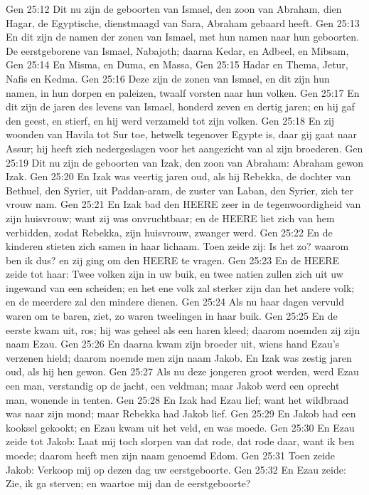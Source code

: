 Gen 25:12  Dit nu zijn de geboorten van Ismael, den zoon van Abraham, dien Hagar, de Egyptische, dienstmaagd van Sara, Abraham gebaard heeft.
Gen 25:13  En dit zijn de namen der zonen van Ismael, met hun namen naar hun geboorten. De eerstgeborene van Ismael, Nabajoth; daarna Kedar, en Adbeel, en Mibsam,
Gen 25:14  En Misma, en Duma, en Massa,
Gen 25:15  Hadar en Thema, Jetur, Nafis en Kedma.
Gen 25:16  Deze zijn de zonen van Ismael, en dit zijn hun namen, in hun dorpen en paleizen, twaalf vorsten naar hun volken.
Gen 25:17  En dit zijn de jaren des levens van Ismael, honderd zeven en dertig jaren; en hij gaf den geest, en stierf, en hij werd verzameld tot zijn volken.
Gen 25:18  En zij woonden van Havila tot Sur toe, hetwelk tegenover Egypte is, daar gij gaat naar Assur; hij heeft zich nedergeslagen voor het aangezicht van al zijn broederen.
Gen 25:19  Dit nu zijn de geboorten van Izak, den zoon van Abraham: Abraham gewon Izak.
Gen 25:20  En Izak was veertig jaren oud, als hij Rebekka, de dochter van Bethuel, den Syrier, uit Paddan-aram, de zuster van Laban, den Syrier, zich ter vrouw nam.
Gen 25:21  En Izak bad den HEERE zeer in de tegenwoordigheid van zijn huisvrouw; want zij was onvruchtbaar; en de HEERE liet zich van hem verbidden, zodat Rebekka, zijn huisvrouw, zwanger werd.
Gen 25:22  En de kinderen stieten zich samen in haar lichaam. Toen zeide zij: Is het zo? waarom ben ik dus? en zij ging om den HEERE te vragen.
Gen 25:23  En de HEERE zeide tot haar: Twee volken zijn in uw buik, en twee natien zullen zich uit uw ingewand van een scheiden; en het ene volk zal sterker zijn dan het andere volk; en de meerdere zal den mindere dienen.
Gen 25:24  Als nu haar dagen vervuld waren om te baren, ziet, zo waren tweelingen in haar buik.
Gen 25:25  En de eerste kwam uit, ros; hij was geheel als een haren kleed; daarom noemden zij zijn naam Ezau.
Gen 25:26  En daarna kwam zijn broeder uit, wiens hand Ezau's verzenen hield; daarom noemde men zijn naam Jakob. En Izak was zestig jaren oud, als hij hen gewon.
Gen 25:27  Als nu deze jongeren groot werden, werd Ezau een man, verstandig op de jacht, een veldman; maar Jakob werd een oprecht man, wonende in tenten.
Gen 25:28  En Izak had Ezau lief; want het wildbraad was naar zijn mond; maar Rebekka had Jakob lief.
Gen 25:29  En Jakob had een kooksel gekookt; en Ezau kwam uit het veld, en was moede.
Gen 25:30  En Ezau zeide tot Jakob: Laat mij toch slorpen van dat rode, dat rode daar, want ik ben moede; daarom heeft men zijn naam genoemd Edom.
Gen 25:31  Toen zeide Jakob: Verkoop mij op dezen dag uw eerstgeboorte.
Gen 25:32  En Ezau zeide: Zie, ik ga sterven; en waartoe mij dan de eerstgeboorte?
